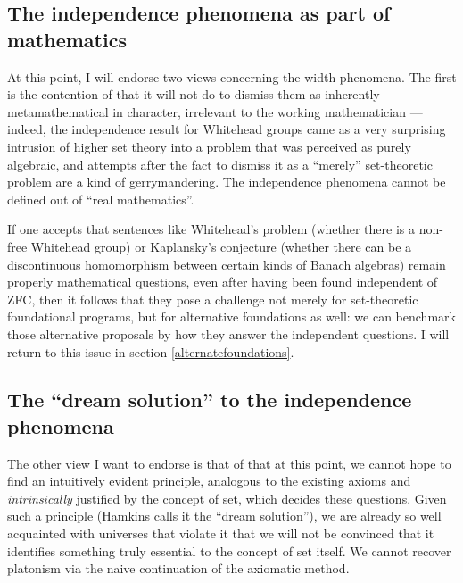 \documentclass[letterpaper,12pt]{article}
\begin{document}
\subsection{The independence phenomena as part of mathematics}
\label{independenceismath}
At this point, I will endorse two views concerning the width phenomena. The first is the contention of \cite{magidor2012some} that it will not do to dismiss them as inherently metamathematical in character, irrelevant to the working mathematician --- indeed, the independence result for Whitehead groups came as a very surprising intrusion of higher set theory into a problem that was perceived as purely algebraic, and attempts after the fact to dismiss it as a ``merely'' set-theoretic problem are a kind of gerrymandering. The independence phenomena cannot be defined out of ``real mathematics''. %

If one accepts that sentences like Whitehead's problem (whether there is a non-free Whitehead group) or Kaplansky's conjecture (whether there can be a discontinuous homomorphism between certain kinds of Banach algebras) remain properly mathematical questions, even after having been found independent of ZFC, then it follows that they pose a challenge not merely for set-theoretic foundational programs, but for alternative foundations as well: we can benchmark those alternative proposals by how they answer the independent questions. I will return to this issue in section \ref{alternatefoundations}.

\subsection{The ``dream solution'' to the independence phenomena}
\label{dreamsolution}
The other view I want to endorse is that of \cite{hamkins2012set} that at this point, we cannot hope to find an intuitively evident principle, analogous to the existing axioms and \emph{intrinsically} justified by the concept of set, which decides these questions. Given such a principle (Hamkins calls it the ``dream solution''), we are already so well acquainted with universes that violate it that we will not be convinced that it identifies something truly essential to the concept of set itself. We cannot recover platonism via the naive continuation of the axiomatic method.
\end{document}
